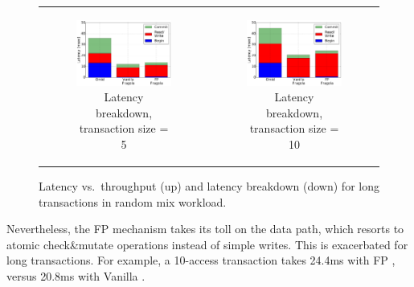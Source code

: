 \begin{figure}[t]
{\begin{tabular}{cc}
   \begin{subfigure}[t]{0.45\textwidth}
	\includegraphics[width=.9\textwidth]{figs/latency_tx5.pdf}
	\caption[]{Latency breakdown, transaction size = 5}
    \label{fig:stack-tx5}
  \end{subfigure} &
  
  \begin{subfigure}[t]{0.45\textwidth}
	\includegraphics[width=.9\textwidth]{figs/latency_tx10.pdf}
	\caption[]{Latency breakdown, transaction size = 10}
    \label{fig:stack-tx10}
  \end{subfigure} 
\end{tabular}  	
}		
  \caption{Latency vs.\ throughput (up) and latency breakdown (down) for long transactions in random mix workload. }
  \label{fig:throughput-latency}
\end{figure}


Nevertheless,
the FP mechanism takes its toll on the data path, which resorts to atomic check\&mutate operations 
instead of simple writes. This is exacerbated for long transactions. 
For example, a 10-access transaction takes 24.4ms with FP \sys, 
versus 20.8ms with Vanilla \sys. 

